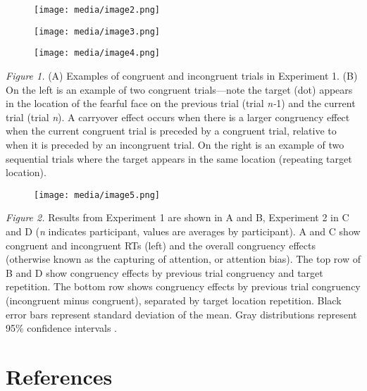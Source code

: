 \documentclass{article}
\begin{document}
\begin{figure}

  \texttt{[image: media/image2.png]}
\caption{}
\label{}


\end{figure}

\begin{figure}

  \texttt{[image: media/image3.png]}
\caption{}
\label{}


\end{figure}

\begin{figure}

  \texttt{[image: media/image4.png]}
\caption{}
\label{}


\end{figure}


\emph{Figure 1. }(A) Examples of congruent and incongruent trials in Experiment 1. (B) On the left is an example of two congruent trials—note the target (dot) appears in the location of the fearful face on the previous trial (trial \emph{n-}1) and the current trial (trial \emph{n}). A carryover effect occurs when there is a larger congruency effect when the current congruent trial is preceded by a congruent trial, relative to when it is preceded by an incongruent trial. On the right is an example of two sequential trials where the target appears in the same location (repeating target location). 


\begin{figure}

  \texttt{[image: media/image5.png]}
\caption{}
\label{}


\end{figure}


\emph{Figure 2. }Results from Experiment 1 are shown in A and B, Experiment 2 in C and D (\emph{n} indicates participant, values are averages by participant). A and C show congruent and incongruent RTs (left) and the overall congruency effects (otherwise known as the capturing of attention, or attention bias). The top row of B and D show congruency effects by previous trial congruency and target repetition. The bottom row shows congruency effects by previous trial congruency (incongruent minus congruent), separated by target location repetition. Black error bars represent standard deviation of the mean. Gray distributions represent 95\% confidence intervals \parencite{Ho2019}. 



\section{References}
\end{document}
